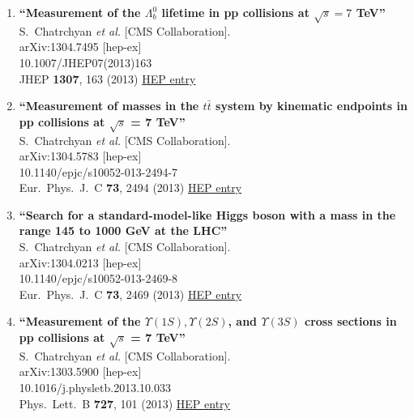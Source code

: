 \documentclass{article}
\begin{document}
\begin{enumerate}
\item%
{\bf ``Measurement of the $\Lambda_{b}^0$ lifetime in pp collisions at $\sqrt{s} = 7$ TeV''}
  \\{}S.~Chatrchyan {\it et al.} [CMS Collaboration].
  \\{}arXiv:1304.7495 [hep-ex]
    \\{}10.1007/JHEP07(2013)163
\\{}JHEP {\bf 1307}, 163 (2013) %
\href{http://inspirehep.net/record/1230936}{HEP entry}


\item%
{\bf ``Measurement of masses in the $t \bar{t}$ system by kinematic endpoints in pp collisions at $\sqrt{s}$ = 7 TeV''}
  \\{}S.~Chatrchyan {\it et al.} [CMS Collaboration].
  \\{}arXiv:1304.5783 [hep-ex]
    \\{}10.1140/epjc/s10052-013-2494-7
\\{}Eur.\ Phys.\ J.\ C {\bf 73}, 2494 (2013) %
\href{http://inspirehep.net/record/1229333}{HEP entry}


\item%
{\bf ``Search for a standard-model-like Higgs boson with a mass in the range 145 to 1000 GeV at the LHC''}
  \\{}S.~Chatrchyan {\it et al.} [CMS Collaboration].
  \\{}arXiv:1304.0213 [hep-ex]
    \\{}10.1140/epjc/s10052-013-2469-8
\\{}Eur.\ Phys.\ J.\ C {\bf 73}, 2469 (2013) %
\href{http://inspirehep.net/record/1225976}{HEP entry}


\item%
{\bf ``Measurement of the $\Upsilon(1S), \Upsilon(2S)$, and $\Upsilon(3S)$ cross sections in pp collisions at $\sqrt{s}$ = 7 TeV''}
  \\{}S.~Chatrchyan {\it et al.} [CMS Collaboration].
  \\{}arXiv:1303.5900 [hep-ex]
    \\{}10.1016/j.physletb.2013.10.033
\\{}Phys.\ Lett.\ B {\bf 727}, 101 (2013) %
\href{http://inspirehep.net/record/1225274}{HEP entry}



\end{enumerate}
\end{document}

